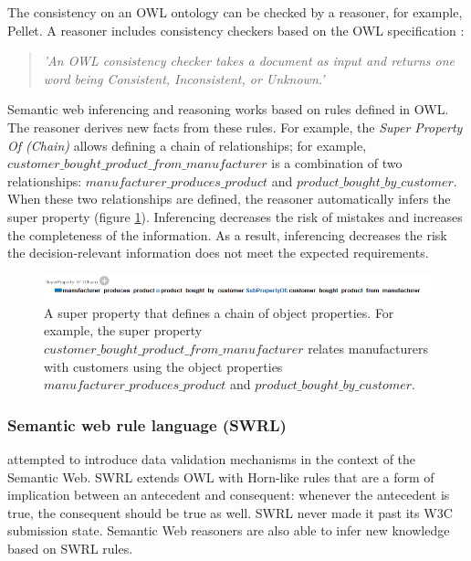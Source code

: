 The consistency on an OWL ontology can be checked by a reasoner, for example, Pellet. A reasoner includes consistency checkers based on the OWL specification \parencite{SM32}:
\begin{quote}\itshape
'An OWL consistency checker takes a document as input and returns one word being Consistent, Inconsistent, or Unknown.' \parencite{WEB12}
\end{quote}

Semantic web inferencing and reasoning works based on rules defined in OWL. The reasoner derives new facts from these rules. For example, the \emph{Super Property Of (Chain)} allows defining a chain of relationships; for example, $customer\_bought\_product\_from\_manufacturer$ is a combination of two relationships: $manufacturer\_produces\_product$ and $product\_bought\_by\_customer$. When these two relationships are defined, the reasoner automatically infers the super property (figure \ref{fig:superproperty}). Inferencing decreases the risk of mistakes and increases the completeness of the information. As a result, inferencing decreases the risk the decision-relevant information does not meet the expected requirements.

\begin{figure}[H]
\centering
  \includegraphics[width=17cm]{../../Images/Superproperty.png}
  \caption{A super property that defines a chain of object properties. For example, the super property $customer\_bought\_product\_from\_manufacturer$ relates manufacturers with customers using the object properties $manufacturer\_produces\_product$ and $product\_bought\_by\_customer$.}
  \label{fig:superproperty}
\end{figure}

\subsubsection{Semantic web rule language (SWRL)}
\cite{SM35} attempted to introduce data validation mechanisms in the context of the Semantic Web. SWRL extends OWL with Horn-like rules that are a form of implication between an antecedent and consequent: whenever the antecedent is true, the consequent should be true as well. SWRL never made it past its W3C submission state. Semantic Web reasoners are also able to infer new knowledge based on SWRL rules.

